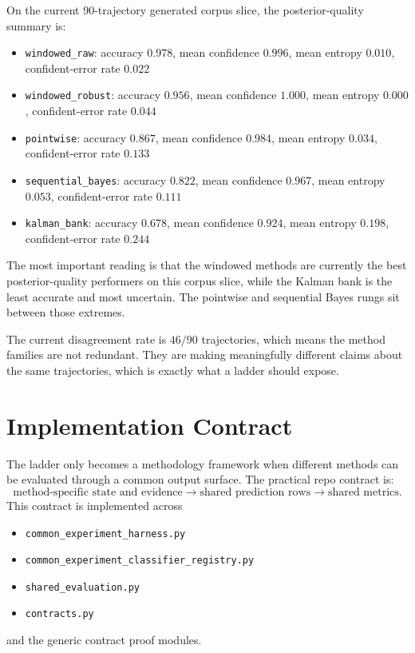 \documentclass[11pt]{article}
\begin{document}
On the current 90-trajectory generated corpus slice, the posterior-quality
summary is:
\begin{itemize}[leftmargin=1.5em]
    \item \texttt{windowed\_raw}: accuracy \(0.978\), mean confidence \(0.996\),
    mean entropy \(0.010\), confident-error rate \(0.022\)
    \item \texttt{windowed\_robust}: accuracy \(0.956\), mean confidence \(1.000\),
    mean entropy \(0.000\), confident-error rate \(0.044\)
    \item \texttt{pointwise}: accuracy \(0.867\), mean confidence \(0.984\),
    mean entropy \(0.034\), confident-error rate \(0.133\)
    \item \texttt{sequential\_bayes}: accuracy \(0.822\), mean confidence \(0.967\),
    mean entropy \(0.053\), confident-error rate \(0.111\)
    \item \texttt{kalman\_bank}: accuracy \(0.678\), mean confidence \(0.924\),
    mean entropy \(0.198\), confident-error rate \(0.244\)
\end{itemize}
The most important reading is that the windowed methods are currently the best
posterior-quality performers on this corpus slice, while the Kalman bank is the
least accurate and most uncertain. The pointwise and sequential Bayes rungs
sit between those extremes.

The current disagreement rate is \(46/90\) trajectories, which means the method
families are not redundant. They are making meaningfully different claims about
the same trajectories, which is exactly what a ladder should expose.

\section{Implementation Contract}

The ladder only becomes a methodology framework when different methods can be
evaluated through a common output surface. The practical repo contract is:
\begin{equation}
    \text{method-specific state and evidence}
    \rightarrow
    \text{shared prediction rows}
    \rightarrow
    \text{shared metrics}.
\end{equation}
This contract is implemented across
\begin{itemize}[leftmargin=1.5em]
    \item \texttt{common\_experiment\_harness.py}
    \item \texttt{common\_experiment\_classifier\_registry.py}
    \item \texttt{shared\_evaluation.py}
    \item \texttt{contracts.py}
\end{itemize}
and the generic contract proof modules.
\end{document}
